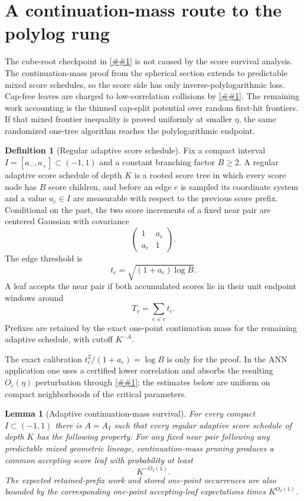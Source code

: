 \documentclass[10pt]{article}
\newcommand{\cref}[1]{\ref{##1}}
\newtheorem{lemma}[theorem]{Lemma}
\theoremstyle{definition}
\newtheorem{definition}[theorem]{Definition}
\begin{document}
\section{A continuation-mass route to the polylog rung}

The cube-root checkpoint in \cref{prop:one-third} is not caused by the score survival analysis. The continuation-mass proof from the spherical section extends to predictable mixed score schedules, so the score side has only inverse-polylogarithmic loss. Cap-free leaves are charged to low-correlation collisions by \cref{lem:cap-free-scan-accounting}. The remaining work accounting is the thinned cap-split potential over random first-hit frontiers. If that mixed frontier inequality is proved uniformly at smaller $\eta$, the same randomized one-tree algorithm reaches the polylogarithmic endpoint.

\begin{definition}[Regular adaptive score schedule]\label{def:regular-adaptive-score}
   Fix a compact interval $I=[a_-,a_+]\subset(-1,1)$ and a constant branching factor $B\ge2$. A regular adaptive score schedule of depth $K$ is a rooted score tree in which every score node has $B$ score children, and before an edge $e$ is sampled its coordinate system and a value $a_e\in I$ are measurable with respect to the previous score prefix. Conditional on the past, the two score increments of a fixed near pair are centered Gaussian with covariance
   \[
      \begin{pmatrix}1&a_e\\ a_e&1\end{pmatrix}.
   \]
   The edge threshold is
   \[
      t_e=\sqrt{(1+a_e)\log B}.
   \]
   A leaf accepts the near pair if both accumulated scores lie in their unit endpoint windows around
   \[
      T_v=\sum_{e\preceq v}t_e .
   \]
   Prefixes are retained by the exact one-point continuation mass for the remaining adaptive schedule, with cutoff $K^{-A}$.
\end{definition}

The exact calibration $t_e^2/(1+a_e)=\log B$ is only for the proof. In the ANN application one uses a certified lower correlation and absorbs the resulting $O_c(\eta)$ perturbation through \cref{lem:rho-stability}; the estimates below are uniform on compact neighborhoods of the critical parameters.

\begin{lemma}[Adaptive continuation-mass survival]\label{lem:adaptive-continuation}
   For every compact $I\subset(-1,1)$ there is $A=A_I$ such that every regular adaptive score schedule of depth $K$ has the following property. For any fixed near pair following any predictable mixed geometric lineage, continuation-mass pruning produces a common accepting score leaf with probability at least
   \[
      K^{-O_I(1)}.
   \]
   The expected retained-prefix work and stored one-point occurrences are also bounded by the corresponding one-point accepting-leaf expectations times $K^{O_I(1)}$.
\end{lemma}
\end{document}
